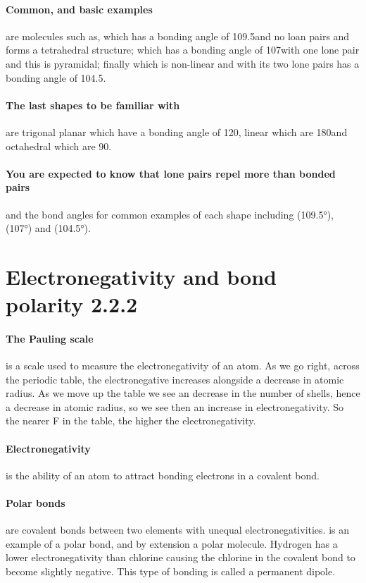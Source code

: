 	\paragraph{Common, and basic examples} are molecules such as,  which has a bonding angle of 109.5\degree and no loan pairs and forms a tetrahedral structure;  which has a bonding angle of 107\degree with one lone pair and this is pyramidal; finally  which is non-linear and with its two lone pairs has a bonding angle of 104.5\degree .
	
	\paragraph{The last shapes to be familiar with} are trigonal planar which have a bonding angle of 120\degree , linear which are 180\degree and octahedral which are 90\degree . 
  \paragraph{You are expected to know that lone pairs repel more than bonded pairs} and the bond angles for common examples of each shape including  (109.5°),  (107°) and  (104.5°).
  \section{Electronegativity and bond polarity 2.2.2}
	\paragraph{The Pauling scale} is a scale used to measure the electronegativity of an atom. As we go right, across the periodic table, the electronegative increases alongside a decrease in atomic radius. As we move up the table we see an decrease in the number of shells, hence a decrease in atomic radius, so we see then an increase in electronegativity. So the nearer F in the table, the higher the electronegativity.
	
	\paragraph{Electronegativity} is the ability of an atom to attract bonding electrons in a covalent bond.
	
	\paragraph{Polar bonds} are covalent bonds between two elements with unequal electronegativities.
	 is an example of a polar bond, and by extension a polar molecule.
	Hydrogen has a lower electronegativity than chlorine causing the chlorine in the covalent bond to become slightly negative.
	This type of bonding is called a permanent dipole.

